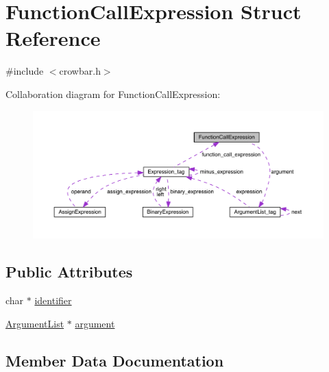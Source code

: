 \hypertarget{struct_function_call_expression}{}\section{Function\+Call\+Expression Struct Reference}
\label{struct_function_call_expression}


{\ttfamily \#include $<$crowbar.\+h$>$}



Collaboration diagram for Function\+Call\+Expression\+:\nopagebreak
\begin{figure}[H]
\begin{center}
\leavevmode
\includegraphics[width=350pt]{struct_function_call_expression__coll__graph}
\end{center}
\end{figure}
\subsection*{Public Attributes}
\begin{DoxyCompactItemize}
\item 
char $\ast$ \hyperlink{struct_function_call_expression_a9c3a09de854a826e104f65297edd184b}{identifier}
\item 
\hyperlink{crowbar_8h_ad4ba12ca8ae3ead90081fb0aba63aff3}{Argument\+List} $\ast$ \hyperlink{struct_function_call_expression_a278e6d5a95113ab48d019026c4e5641d}{argument}
\end{DoxyCompactItemize}


\subsection{Member Data Documentation}
\hypertarget{struct_function_call_expression_a278e6d5a95113ab48d019026c4e5641d}{}
